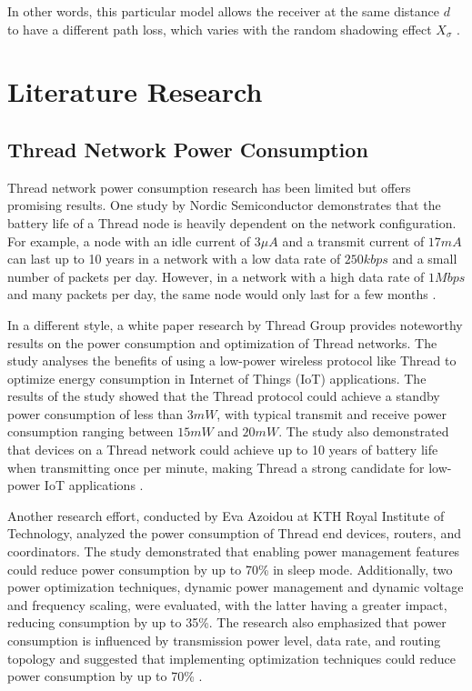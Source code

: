 In other words, this particular model allows the receiver at the same distance $d$ to have a different path loss, which varies with the random shadowing effect $X_\sigma$ \cite{cho2010mimo}.


\section{Literature Research}\label{sec:literature_research}
\subsection{Thread Network Power Consumption}
Thread network power consumption research has been limited but offers promising results. One study by Nordic Semiconductor demonstrates that the battery life of a Thread node is heavily dependent on the network configuration. For example, a node with an idle current of $3 \mu A$ and a transmit current of $17 mA$ can last up to 10 years in a network with a low data rate of $250 kbps$ and a small number of packets per day. However, in a network with a high data rate of $1 Mbps$ and many packets per day, the same node would only last for a few months \cite{semiconductor_battery_2021}.

In a different style, a white paper research by Thread Group provides noteworthy results on the power consumption and optimization of Thread networks. The study analyses the benefits of using a low-power wireless protocol like Thread to optimize energy consumption in Internet of Things (IoT) applications. The results of the study showed that the Thread protocol could achieve a standby power consumption of less than $3mW$, with typical transmit and receive power consumption ranging between $15mW$ and $20mW$. The study also demonstrated that devices on a Thread network could achieve up to 10 years of battery life when transmitting once per minute, making Thread a strong candidate for low-power IoT applications \cite{Thread_Low_Power_2018}.

Another research effort, conducted by Eva Azoidou at KTH Royal Institute of Technology, analyzed the power consumption of Thread end devices, routers, and coordinators. The study demonstrated that enabling power management features could reduce power consumption by up to 70\% in sleep mode. Additionally, two power optimization techniques, dynamic power management and dynamic voltage and frequency scaling, were evaluated, with the latter having a greater impact, reducing consumption by up to 35\%. The research also emphasized that power consumption is influenced by transmission power level, data rate, and routing topology and suggested that implementing optimization techniques could reduce power consumption by up to 70\% \cite{azoidou2017battery}.

